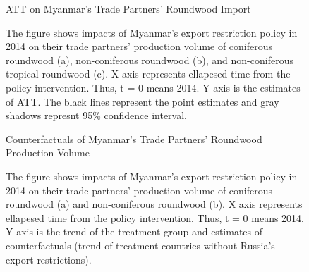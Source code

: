 \documentclass[a4paper,12pt]{article}
\begin{document}
\begin{figure}[htbp] 
    \centering
    \caption{ATT on Myanmar's Trade Partners' Roundwood Import}
    \caption*{\small{The figure shows impacts of Myanmar's export restriction policy in 2014 on their trade partners' production volume of coniferous roundwood (a), non-coniferous roundwood (b), and non-coniferous tropical roundwood (c). X axis represents ellapesed time from the policy intervention. Thus, t = 0 means 2014. Y axis is the estimates of ATT. The black lines represent the point estimates and gray shadows represnt 95\% confidence interval.}}
    \label{fig:att_imp_Myanmar}
\end{figure}


\begin{figure}[htbp] 
    \centering
    \caption{Counterfactuals of Myanmar's Trade Partners' Roundwood Production Volume}
    \caption*{\small{The figure shows impacts of Myanmar's export restriction policy in 2014 on their trade partners' production volume of coniferous roundwood (a) and non-coniferous roundwood (b). X axis represents ellapesed time from the policy intervention. Thus, t = 0 means 2014. Y axis is the trend of the treatment group and estimates of counterfactuals (trend of treatment countries without Russia's export restrictions).}}
    \label{fig:cf_prod_Myanmar}
\end{figure}
\end{document}
